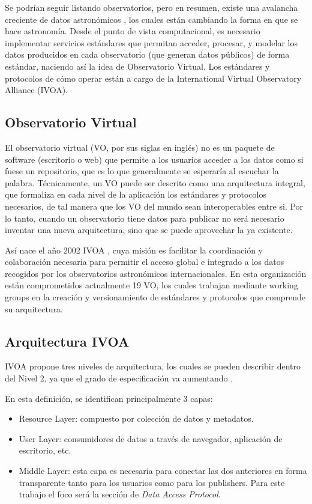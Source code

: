 Se podrían seguir listando observatorios, pero en resumen, existe una
avalancha creciente de datos astronómicos \cite{kborne}, los cuales están cambiando la forma
en que se hace astronomía. Desde el punto de vista computacional, es necesario
implementar servicios estándares que permitan acceder, procesar, y modelar los
datos producidos en cada observatorio (que generan datos públicos) de forma
estándar, naciendo así la idea de Observatorio Virtual. Los estándares y
protocolos de cómo operar están a cargo de la International Virtual Observatory
Alliance (IVOA). 

\subsection{Observatorio Virtual}
El observatorio virtual (VO, por sus siglas en inglés) no es un paquete de software (escritorio o web) que
permite a los usuarios acceder a los datos como si fuese un repositorio, que es
lo que generalmente se esperaría al escuchar la palabra. Técnicamente, un VO
puede ser descrito como una arquitectura integral, que formaliza en cada
nivel de la aplicación los estándares y protocolos necesarios, de tal manera
que los VO del mundo sean interoperables entre si. Por lo tanto, cuando un
observatorio tiene datos para publicar no será necesario inventar una nueva
arquitectura, sino que se puede aprovechar la ya existente.

Así nace el año 2002 IVOA \cite{ivoa}, cuya misión es facilitar
la coordinación y colaboración necesaria para permitir el acceso global e
integrado a los datos recogidos por los observatorios astronómicos
internacionales. En esta organización están comprometidos actualmente 19 VO,
los cuales trabajan mediante working groups en la creación y versionamiento de
estándares y protocolos que comprende su arquitectura.

\subsection{Arquitectura IVOA}

IVOA propone tres niveles de arquitectura, los cuales se pueden describir
dentro del Nivel 2, ya que el grado de especificación va aumentando \cite{arch}.

En esta definición, se identifican principalmente 3 capas:
\begin{itemize}
	\item Resource Layer: compuesto por colección de datos y metadatos.
	\item User Layer: consumidores de datos a través de navegador,
aplicación de escritorio, etc.
	\item Middle Layer: esta capa es necesaria para conectar las dos
anteriores en forma transparente tanto para los usuarios como para los
publishers. Para este trabajo el foco será la sección de \emph{Data Access Protocol}.
\end{itemize}

